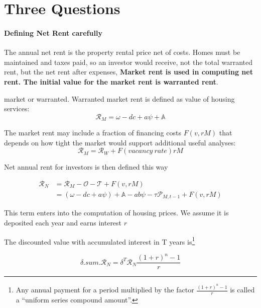 \chapter{Three Questions}



\subsubsection{Defining Net Rent carefully}

The annual \gls{net rent} is the property rental price  net of costs. Homes must be maintained and taxes paid, so an investor would receive, not the total warranted rent, but the net rent after expenses,
\textbf{Market rent is used in computing net rent. The initial value for the market rent is \gls{warranted rent}}.

market or warranted.
Warranted market rent is defined as value of housing services:
\[\mathcal{R}_M = \omega - dc + a\psi + \mathbb{A}\]

The market rent may include  a fraction of financing costs $F(v, rM)$  that depends on how tight the market would support additional useful analyses:
 \[\mathcal{R}_M=\mathcal{R}_W + F(vacancy\ rate) rM\]
 

Net annual rent for investors is then  defined this way 

\begin{align}\mathcal{R}_N &= \mathcal{R}_M - \mathcal{O} - \mathcal{T} + F(v, rM)\nonumber\\
&= (\omega - {dc} + a\psi )+ \mathbb{A} - a b \psi - \tau  \mathcal{P}_{M, t-1}  + F(v, rM)
\end{align}

This term enters into the computation of housing prices. We assume it is deposited each year and earns interest $r$

{\color{blue}
The discounted value with accumulated interest in T years is\footnote{Any annual payment for a period multiplied by the factor $\frac{(1+r)^n-1}{r}$ is called a  ``uniform series compound amount''.%
}

\[\delta.sum.\mathcal{R}_N=
\delta^T\mathcal{R}_N 
\frac{(1+r)^n-1}{r} \]
}

